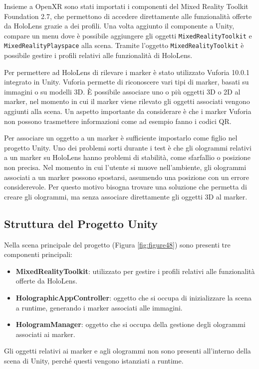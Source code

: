 Insieme a OpenXR sono stati importati i componenti del Mixed Reality Toolkit Foundation 2.7, che permettono di accedere direttamente alle funzionalità offerte da HoloLens grazie a dei profili.
Una volta aggiunto il componente a Unity, compare un menu dove è possibile aggiungere gli oggetti \texttt{MixedRealityToolkit} e \texttt{MixedRealityPlayspace} alla scena.
Tramite l'oggetto \texttt{MixedRealityToolkit} è possibile gestire i profili relativi alle funzionalità di HoloLens.

Per permettere ad HoloLens di rilevare i marker è stato utilizzato Vuforia 10.0.1 integrato in Unity.
Vuforia permette di riconoscere vari tipi di marker, basati su immagini o su modelli 3D. È possibile associare uno o più oggetti 3D o 2D al marker, nel momento in cui il marker viene rilevato gli oggetti associati vengono aggiunti alla scena.
Un aspetto importante da considerare è che i marker Vuforia non possono trasmettere informazioni come ad esempio fanno i codici QR.

Per associare un oggetto a un marker è sufficiente impostarlo come figlio nel progetto Unity.
Uno dei problemi sorti durante i test è che gli ologrammi relativi a un marker su HoloLens hanno problemi di stabilità, come sfarfallio o posizione non precisa.
Nel momento in cui l'utente si muove nell'ambiente, gli ologrammi associati a un marker possono spostarsi, assumendo una posizione con un errore considerevole. Per questo motivo bisogna trovare una soluzione che permetta di creare gli ologrammi, ma senza associare direttamente gli oggetti 3D al marker.

\subsection{Struttura del Progetto Unity}
Nella scena principale del progetto (Figura \ref{fig:figure48}) sono presenti tre componenti principali:
\begin{itemize}
    \item \textbf{MixedRealityToolkit}: utilizzato per gestire i profili relativi alle funzionalità offerte da HoloLens.
    \item \textbf{HolographicAppController}: oggetto che si occupa di inizializzare la scena a runtime, generando i marker associati alle immagini.
    \item \textbf{HologramManager}: oggetto che si occupa della gestione degli ologrammi associati ai marker.
\end{itemize}

Gli oggetti relativi ai marker e agli ologrammi non sono presenti all'interno della scena di Unity, perché questi vengono istanziati a runtime.

